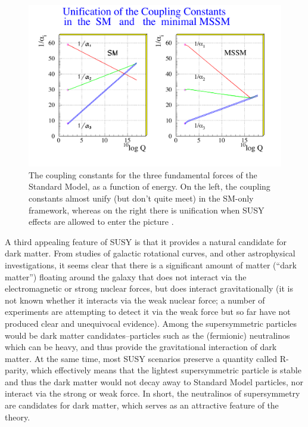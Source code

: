 \begin{figure}
	\includegraphics[width=\textwidth]{Theory/figures/kazakov_coupling.pdf}
    \caption{The coupling constants for the three fundamental forces of the Standard Model, as a function of energy.  On the left, the coupling constants almost unify (but don't quite meet) in the SM-only framework, whereas on the right there is unification when SUSY effects are allowed to enter the picture \cite{Kazakov}. }
	\label{fig:couplings}
\end{figure}


A third appealing feature of SUSY is that it provides a natural candidate for dark matter.  From studies of galactic rotational curves, and other astrophysical investigations, it seems clear that there is a significant amount of matter (``dark matter'') floating around the galaxy that does not interact via the electromagnetic or strong nuclear forces, but does interact gravitationally (it is not known whether it interacts via the weak nuclear force; a number of experiments are attempting to detect it via the weak force but so far have not produced clear and unequivocal evidence).  Among the supersymmetric particles would be dark matter candidates--particles such as the (fermionic) neutralinos which can be heavy, and thus provide the gravitational interaction of dark matter.  At the same time, most SUSY scenarios preserve a quantity called R-parity, which effectively means that the lightest supersymmetric particle is stable and thus the dark matter would not decay away to Standard Model particles, nor interact via the strong or weak force.  In short, the neutralinos of supersymmetry are candidates for dark matter, which serves as an attractive feature of the theory. 


